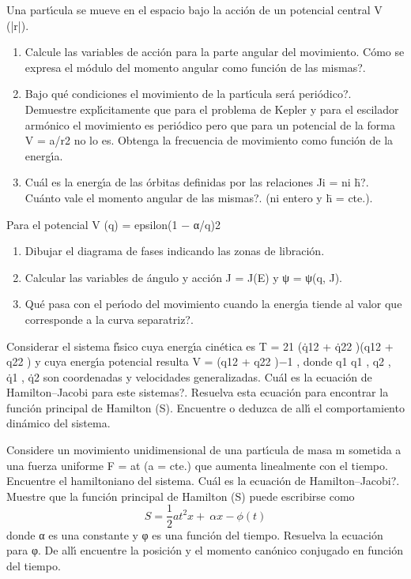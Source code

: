 \documentclass[10pt,oneside]{CBFT_book}
\begin{document}
\begin{ejercicios}
\label{ej25}
\item{ \bf }
Una partı́cula se mueve en el espacio bajo la acción de un potencial central V (|r|).
\begin{enumerate}[label=(\alph*)]
\item Calcule las variables de acción para la parte angular del movimiento. Cómo se
expresa el módulo del momento angular como función de las mismas?.
\item Bajo qué condiciones el movimiento de la partı́cula será periódico?. Demuestre
explı́citamente que para el problema de Kepler y para el escilador armónico el
movimiento es periódico pero que para un potencial de la forma V = a/r2 no lo
es. Obtenga la frecuencia de movimiento como función de la energı́a.
\item Cuál es la energı́a de las órbitas definidas por las relaciones Ji = ni h̄?. Cuánto
vale el momento angular de las mismas?. (ni entero y h̄ = cte.).
\end{enumerate}

\label{ej26}
\item{ \bf }
Para el potencial V (q) = epsilon(1 − α/q)2
\begin{enumerate}[label=(\alph*)]
\item Dibujar el diagrama de fases indicando las zonas de libración.
\item Calcular las variables de ángulo y acción J = J(E) y ψ = ψ(q, J).
\item Qué pasa con el perı́odo del movimiento cuando la energı́a tiende al valor que
corresponde a la curva separatriz?.
\end{enumerate}

\label{ej27}
\item{ \bf }
Considerar el sistema fı́sico cuya energı́a cinética es T = 21 (q̇12 + q̇22 )(q12 + q22 ) y cuya
energı́a potencial resulta V = (q12 + q22 )−1 , donde q1 q1 , q2 , q̇1 , q̇2 son coordenadas y
velocidades generalizadas. Cuál es la ecuación de Hamilton–Jacobi para este sistemas?.
Resuelva esta ecuación para encontrar la función principal de Hamilton (S). Encuentre
o deduzca de allı́ el comportamiento dinámico del sistema.

\label{ej28}
\item{ \bf }
Considere un movimiento unidimensional de una partı́cula de masa m sometida a una
fuerza uniforme F = at (a = cte.) que aumenta linealmente con el tiempo. Encuentre
el hamiltoniano del sistema. Cuál es la ecuación de Hamilton–Jacobi?. Muestre que
la función principal de Hamilton (S) puede escribirse como
\[
	S = \frac{1}{2} a t^2 x + \:\alpha x - \phi(t)
\]
donde α es una constante y φ es una función del tiempo. Resuelva la ecuación para φ.
De allı́ encuentre la posición y el momento canónico conjugado en función del tiempo.


\end{ejercicios}
\end{document}
